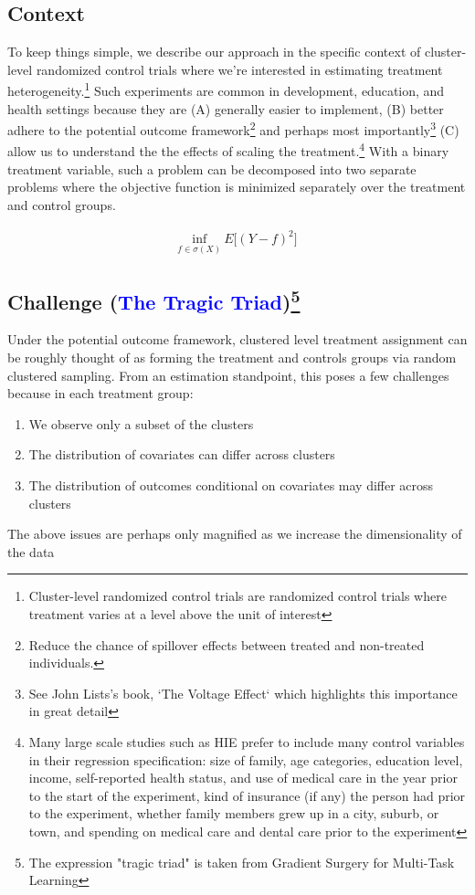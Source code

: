 \documentclass[a4paper,12pt]{article}
\begin{document}
\subsection{Context}
To keep things simple, we describe our approach in the specific context of cluster-level randomized control trials where we're interested in estimating treatment heterogeneity.\footnote{ Cluster-level randomized control trials are randomized control trials where treatment varies at a level above the unit of interest} Such experiments are common in development, education, and health settings because they are (A) generally easier to implement, (B) better adhere to the potential outcome framework\footnote{Reduce the chance of spillover effects between treated and non-treated individuals.} and perhaps most importantly\footnote{See John Lists's book, `The Voltage Effect` which highlights this importance in great detail} (C) allow us to understand the the effects of scaling the treatment.\footnote{Many large scale studies such as HIE prefer to include many control variables in their regression specification: size of family, age categories, education level, income, self-reported health status, and use of medical care in the year prior to the start of the experiment, kind of insurance (if any) the person had prior to the experiment, whether family members grew up in a city, suburb, or town, and spending on medical care and dental care prior to the experiment} With a binary treatment variable, such a problem can be decomposed into two separate problems where the objective function is minimized separately over the treatment and control groups.

\begin{align*}
    \underset{f \in \sigma(X)}{\text{inf}} \ E\big[(Y - f)^2\big]
\end{align*}
 

\subsection{Challenge (\textcolor{blue}{The Tragic Triad})\footnote{The expression "tragic triad" is taken from Gradient Surgery for Multi-Task Learning}}
Under the potential outcome framework, clustered level treatment assignment can be roughly thought of as forming the treatment and controls groups via random clustered sampling. From an estimation standpoint, this poses a few challenges because in each treatment group:
\begin{enumerate}
    \item We observe only a subset of the clusters
    \item The distribution of covariates can differ across clusters
    \item The distribution of outcomes conditional on covariates may differ across clusters
\end{enumerate}

The above issues are perhaps only magnified as we increase the dimensionality of the data


\end{document}
